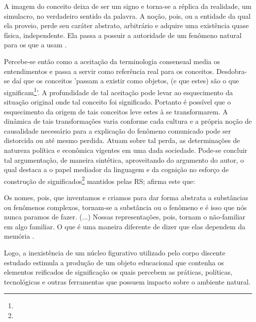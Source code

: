 \documentclass[
  12pt,       %
  openright,      %
  twoside,      %
  a4paper,      %
  english,      %
  french,       %
  spanish,      %
  brazil        %
  ]{abntex2}
\begin{document}
\begin{citacao}
A imagem do
conceito deixa de ser um signo e torna-se a réplica da realidade,
um simulacro, no verdadeiro sentido da palavra. A noção, pois, ou a
entidade da qual ela proveio, perde seu caráter abstrato, 
arbitrário e adquire uma existência quase física, independente. 
Ela passa a possuir a autoridade de um fenômeno natural para os que a
usam \cite[p.74]{Representacees_sociais_moscovici}. 
\end{citacao}


Percebe-se então como a aceitação da terminologia consensual media os entendimentos e passa a servir como referência real para os conceitos. Desdobra-se daí que os conceitos 'passam a existir como objetos, (e que estes) são o que significam\footnote{}'. A profundidade de tal aceitação pode levar ao esquecimento da situação original onde tal conceito foi significado. Portanto é possível que o esquecimento da origem de tais conceitos leve estes à se transformarem. A dinâmica de tais transformações varia conforme cada cultura e a própria noção de causalidade necessário para a explicação do fenômeno comunicado pode ser distorcida ou até mesmo perdida. Atuam sobre tal perda, as determinações de natureza política e econômica vigentes em uma dada sociedade. Pode-se concluir tal argumentação, de maneira sintética, aproveitando do argumento do autor, o qual destaca a o papel mediador da linguagem e da cognição no esforço de construção de significados\footnote{} mantidos pelas RS; afirma este que:

\begin{citacao}
Os nomes, pois,
que inventamos e criamos para dar forma abstrata a substâncias
ou fenômenos complexos, tornam-se a substância ou o fenômeno e
é isso que nós nunca paramos de fazer. (...) Nossas representações,
pois, tornam o não-familiar em algo familiar. O que é uma maneira
diferente de dizer que elas dependem da memória \cite[p.77-78]{Representacees_sociais_moscovici}.
\end{citacao}

Logo, a inexistência de um núcleo figurativo utilizado pelo corpo discente estudado estimula a produção de um objeto educacional que contenha os elementos reificados de significação os quais percebem as práticas, políticas, tecnológicas e outras ferramentas que possuem impacto sobre o ambiente natural.
\end{document}
